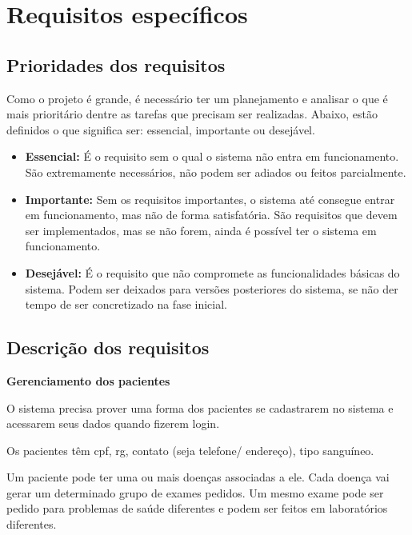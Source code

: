 \documentclass[11pt,a4paper]{report}
\begin{document}
\chapter*{Requisitos específicos}


\section{Prioridades dos requisitos}

Como o projeto é grande, é necessário ter um planejamento e analisar o que é mais prioritário dentre as tarefas que precisam ser realizadas. Abaixo, estão definidos o que significa ser: essencial, importante ou desejável. \\

\begin{itemize}
\item \textbf{Essencial:}
É o requisito sem o qual o sistema não entra em funcionamento.
São extremamente necessários, não podem ser adiados ou feitos parcialmente.

\item \textbf{Importante:}
Sem os requisitos importantes, o sistema até consegue entrar em funcionamento, mas não de forma satisfatória. São requisitos que devem ser implementados, mas se não forem, ainda é possível ter o sistema em funcionamento.


\item \textbf{Desejável:}
É o requisito que não compromete as funcionalidades básicas do sistema. 
Podem ser deixados para versões posteriores do sistema, se não der tempo de ser concretizado na fase inicial.


\end{itemize}


\section{Descrição dos requisitos}


 \textbf{Gerenciamento dos pacientes}
\newline

O sistema precisa prover uma forma dos pacientes se cadastrarem no sistema e acessarem seus dados quando fizerem login.

 Os pacientes têm cpf, rg, contato (seja telefone/ endereço), tipo sanguíneo.

Um paciente pode ter uma ou mais doenças associadas a ele. Cada doença vai gerar um determinado grupo de exames pedidos. Um mesmo exame pode ser pedido para problemas de saúde diferentes e podem ser feitos em laboratórios diferentes.
\end{document}
